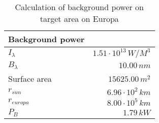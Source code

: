 \begin{table}[H]
\centering
\caption{Calculation of background power on target area on Europa}
\label{tab:background_power}
\begin{tabular}{|l|r|}\hline
    \textbf{Background power} & \\
    \hline 
    $I_\lambda$ & $1.51\cdot10^{13}\,W/M^3$ \\
    $B_\lambda$ & $10.00\,n m$ \\
    Surface area & $15625.00\, m^2$ \\
    $r_{sun}$ & $6.96\cdot10^{2}\,km$ \\
    $r_{europa}$ & $8.00\cdot10^{5}\,km$ \\
    $P_B$ & $1.79\,k W$ \\
    \hline 
\end{tabular}
\end{table}
